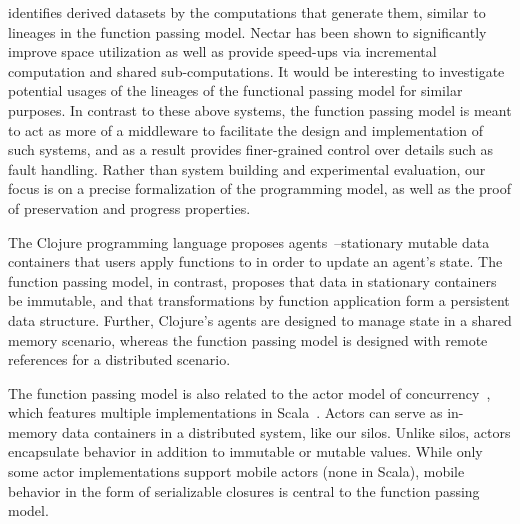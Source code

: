 \documentclass{jfp1}
\begin{document}
identifies derived datasets by the computations that generate them,
similar to lineages in the function passing model. Nectar has been
shown to significantly improve space utilization as well as provide
speed-ups via incremental computation and shared sub-computations. It
would be interesting to investigate potential usages of the lineages
of the functional passing model for similar purposes. In contrast to
these above systems, the function passing model is meant to act as
more of a middleware to facilitate the design and implementation of
such systems, and as a result provides finer-grained control over
details such as fault handling. Rather than system building and
experimental evaluation, our focus is on a precise formalization of
the programming model, as well as the proof of preservation and
progress properties.

The Clojure programming language proposes agents~\cite{Clojure}--stationary
mutable data containers that users apply functions to in order to update an
agent's state. The function passing model, in contrast, proposes that data in
stationary containers be immutable, and that transformations by function
application form a persistent data structure. Further, Clojure's agents are
designed to manage state in a shared memory scenario, whereas the function
passing model is designed with remote references for a distributed scenario.

The function passing model is also related to the actor model of
concurrency~\cite{Actors}, which features multiple implementations in
Scala~\cite{ScalaActors,Akka,TypedActors}. Actors can serve as in-memory data
containers in a distributed system, like our silos. Unlike silos, actors
encapsulate behavior in addition to immutable or mutable values. While only some
actor implementations support mobile actors (none in Scala), mobile behavior in
the form of serializable closures is central to the function passing model.


\end{document}
